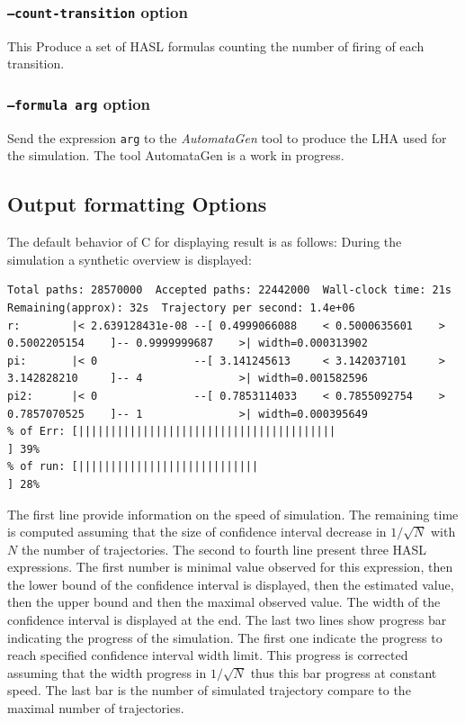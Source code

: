 \documentclass{article}
\newcommand{\cosmos}{\mbox{\textup{C}\scalebox{0.75}{{\textsc{OSMOS}}}}}
\begin{document}
\subsubsection{\texttt{--count-transition} option}
This Produce a set of HASL formulas counting the number of firing of each
transition.

\subsubsection{\texttt{--formula arg} option}
Send the expression \texttt{arg} to the \emph{AutomataGen} tool to produce
the LHA used for the simulation. The tool AutomataGen is a work in progress.

\subsection{Output formatting Options}
The default behavior of \cosmos{} for displaying result is as follows:
During the simulation a synthetic overview is displayed:
\begin{scriptsize}
\begin{verbatim}
Total paths: 28570000  Accepted paths: 22442000  Wall-clock time: 21s  Remaining(approx): 32s  Trajectory per second: 1.4e+06
r:        |< 2.639128431e-08 --[ 0.4999066088    < 0.5000635601    > 0.5002205154    ]-- 0.9999999687    >| width=0.000313902
pi:       |< 0               --[ 3.141245613     < 3.142037101     > 3.142828210     ]-- 4               >| width=0.001582596
pi2:      |< 0               --[ 0.7853114033    < 0.7855092754    > 0.7857070525    ]-- 1               >| width=0.000395649
% of Err: [||||||||||||||||||||||||||||||||||||||||                                                       ] 39%	
% of run: [||||||||||||||||||||||||||||                                                                   ] 28%	
\end{verbatim}
\end{scriptsize}
The first line provide information on the speed of simulation. The
remaining time is computed assuming that the size of confidence
interval decrease in $1/\sqrt{N}$ with $N$ the number of trajectories.
The second to fourth line present three HASL expressions. The first
number is minimal value observed for this expression, then the lower
bound of the confidence interval is displayed, then the estimated
value, then the upper bound and then the maximal observed value. The
width of the confidence interval is displayed at the end.  The last
two lines show progress bar indicating the progress of the
simulation. The first one indicate the progress to reach specified
confidence interval width limit. This progress is corrected assuming
that the width progress in $1/\sqrt{N}$ thus this bar progress at
constant speed. The last bar is the number of simulated trajectory 
compare to the maximal number of trajectories.
\end{document}
